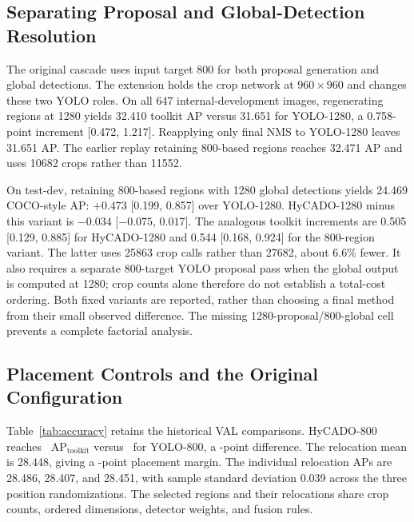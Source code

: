 \documentclass[journal]{IEEEtran}
\newcommand{\APlit}{\mathrm{AP}_{\mathrm{toolkit}}}
\begin{document}
\subsection{Separating Proposal and Global-Detection Resolution}
The original cascade uses input target 800 for both proposal generation and global detections. The extension holds the crop network at $960\times960$ and changes these two YOLO roles. On all 647 internal-development images, regenerating regions at 1280 yields 32.410 toolkit AP versus 31.651 for YOLO-1280, a 0.758-point increment [0.472, 1.217]. Reapplying only final NMS to YOLO-1280 leaves 31.651 AP. The earlier replay retaining 800-based regions reaches 32.471 AP and uses 10682 crops rather than 11552.

On test-dev, retaining 800-based regions with 1280 global detections yields 24.469 COCO-style AP: $+0.473$ [0.199, 0.857] over YOLO-1280. HyCADO-1280 minus this variant is $-0.034$ [$-0.075$, $0.017$]. The analogous toolkit increments are 0.505 [0.129, 0.885] for HyCADO-1280 and 0.544 [0.168, 0.924] for the 800-region variant. The latter uses 25863 crop calls rather than 27682, about 6.6\% fewer. It also requires a separate 800-target YOLO proposal pass when the global output is computed at 1280; crop counts alone therefore do not establish a total-cost ordering. Both fixed variants are reported, rather than choosing a final method from their small observed difference. The missing 1280-proposal/800-global cell prevents a complete factorial analysis.

\subsection{Placement Controls and the Original Configuration}
Table~\ref{tab:accuracy} retains the historical VAL comparisons. HyCADO-800 reaches \APHybrid\ $\APlit$ versus \APYolo\ for YOLO-800, a \GainYolo-point difference. The relocation mean is 28.448, giving a \GainLocation-point placement margin. The individual relocation APs are 28.486, 28.407, and 28.451, with sample standard deviation 0.039 across the three position randomizations. The selected regions and their relocations share crop counts, ordered dimensions, detector weights, and fusion rules.

\begin{table}[t]
\caption{Historical toolkit accuracy on all 548 VisDrone VAL images. SAHI suffixes give slice size. Relocation averages three separate placement scores. Macro AP is the equal-class toolkit diagnostic, distinct from COCO-style AP. HyCADO v1 denotes HyCADO-800.}
\label{tab:accuracy}
\centering\small
\end{table}
\end{document}
